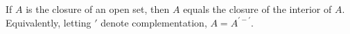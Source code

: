 If $A$ is the closure of an open set, then $A$ equals the closure of the interior of $A$. Equivalently, letting $\prime$ denote complementation, $A = A^{\prime - \prime}$.
